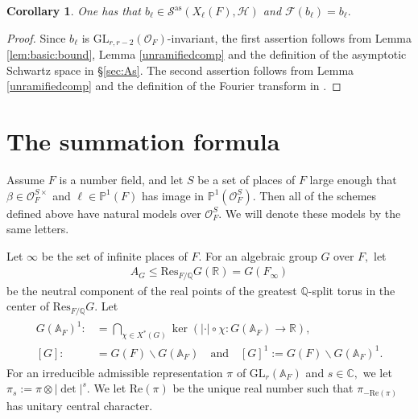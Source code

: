 \documentclass[12pt]{amsart}
\newtheorem{cor}[thm]{Corollary}
\theoremstyle{remark}
\numberwithin{equation}{section}
\newcommand{\A}{\mathbb{A}}
\newcommand{\GL}{\mathrm{GL}}
\newcommand{\QQ}{\mathbb{Q}}
\newcommand{\lto}{\longrightarrow}
\newcommand{\OO}{\mathcal{O}}
\newcommand{\CC}{\mathbb{C}}
\newcommand{\RR}{\mathbb{R}}
\theoremstyle{definition}
\numberwithin{equation}{subsection}
\begin{document}
\begin{cor} \label{cor:basic:fixed}
One has that $b_\ell \in \mathcal{S}^{\mathrm{as}}(X_\ell(F),\mathcal{H})$ and $\mathcal{F}(b_\ell)=b_\ell.$
\end{cor}
\begin{proof} 
Since $b_\ell$ is $\GL_{r,r-2}(\OO_F)$-invariant, the first assertion follows from Lemma \ref{lem:basic:bound},  Lemma \ref{unramifiedcomp} and the definition of the asymptotic Schwartz space in \S \ref{sec:As}.  The second assertion follows from Lemma \ref{unramifiedcomp} and the definition of the Fourier transform in .
\end{proof}















\section{The summation formula} \label{sec:the:sum}

Assume $F$ is a number field, and let $S$ be a set of places of $F$ large enough that $\beta \in \OO_F^{S \times}$ and $\ell \in \mathbb{P}^1(F)$ has image in $\mathbb{P}^1(\OO_F^S).$   Then all of the schemes defined above have natural models over  $\OO_F^S.$   We will denote these models by the same letters.





Let $\infty$ be the set of infinite places of $F.$ For an algebraic group $G$ over $F,$ let 
\begin{align}  \label{AG}
    A_G \leq  \mathrm{Res}_{F/\QQ}G(\RR)=G(F_\infty)
\end{align}
be the neutral component of the real points of the greatest $\QQ$-split torus in the center of $\mathrm{Res}_{F/\QQ}G.$ Let 
\begin{align} \begin{split}
    G(\A_F)^1:&=\bigcap_{\chi \in X^*(G)}\ker(|\cdot| \circ \chi:G(\A_F) \lto \RR),\\
[G]:&=G(F) \backslash G(\A_F) \quad\textrm{and}\quad [G]^1:=G(F) \backslash G(\A_F)^1. \end{split}
\end{align}
For an irreducible admissible representation $\pi$ of $\GL_r(\A_F)$ and $s \in \CC,$ we let $\pi_s:=\pi\otimes |\det|^s.$  We let $\mathrm{Re}(\pi)$ be the unique real number such that $\pi_{-\mathrm{Re}(\pi)}$ has unitary central character.  
\end{document}
